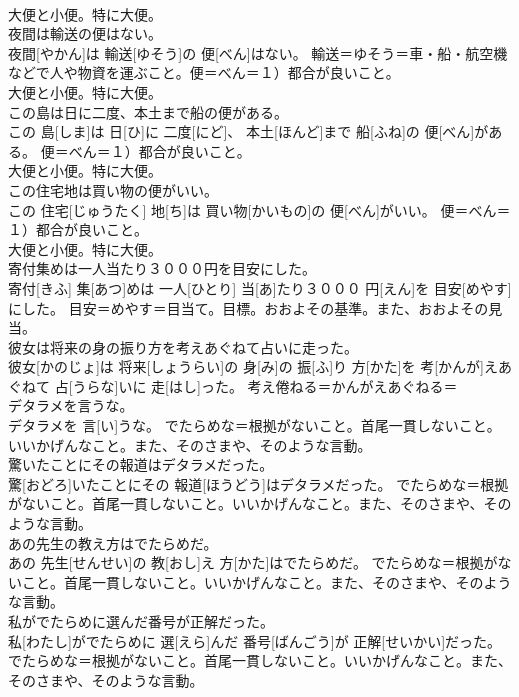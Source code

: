 \documentclass[8pt]{extreport}
\begin{document}
\begin{CJK}{UTF8}{min}
{\\	大便と小便。特に大便。
\\	夜間は輸送の便はない。	
\\	夜間[やかん]は 輸送[ゆそう]の 便[べん]はない。	輸送＝ゆそう＝車・船・航空機などで人や物資を運ぶこと。便＝べん＝１）都合が良いこと。 　　　　　
\\	大便と小便。特に大便。
\\	この島は日に二度、本土まで船の便がある。	
\\	この 島[しま]は 日[ひ]に 二度[にど]、 本土[ほんど]まで 船[ふね]の 便[べん]がある。	便＝べん＝１）都合が良いこと。 　　　　　
\\	大便と小便。特に大便。
\\	この住宅地は買い物の便がいい。	
\\	この 住宅[じゅうたく] 地[ち]は 買い物[かいもの]の 便[べん]がいい。	便＝べん＝１）都合が良いこと。 　　　　　
\\	大便と小便。特に大便。
\\	寄付集めは一人当たり３０００円を目安にした。	
\\	寄付[きふ] 集[あつ]めは 一人[ひとり] 当[あ]たり３０００ 円[えん]を 目安[めやす]にした。	目安＝めやす＝目当て。目標。おおよその基準。また、おおよその見当。
\\	彼女は将来の身の振り方を考えあぐねて占いに走った。	
\\	彼女[かのじょ]は 将来[しょうらい]の 身[み]の 振[ふ]り 方[かた]を 考[かんが]えあぐねて 占[うらな]いに 走[はし]った。	考え倦ねる＝かんがえあぐねる＝ 
\\	デタラメを言うな。	
\\	デタラメを 言[い]うな。	でたらめな＝根拠がないこと。首尾一貫しないこと。いいかげんなこと。また、そのさまや、そのような言動。
\\	驚いたことにその報道はデタラメだった。	
\\	驚[おどろ]いたことにその 報道[ほうどう]はデタラメだった。	でたらめな＝根拠がないこと。首尾一貫しないこと。いいかげんなこと。また、そのさまや、そのような言動。
\\	あの先生の教え方はでたらめだ。	
\\	あの 先生[せんせい]の 教[おし]え 方[かた]はでたらめだ。	でたらめな＝根拠がないこと。首尾一貫しないこと。いいかげんなこと。また、そのさまや、そのような言動。
\\	私がでたらめに選んだ番号が正解だった。	
\\	私[わたし]がでたらめに 選[えら]んだ 番号[ばんごう]が 正解[せいかい]だった。	でたらめな＝根拠がないこと。首尾一貫しないこと。いいかげんなこと。また、そのさまや、そのような言動。
}
\end{CJK}
\end{document}
